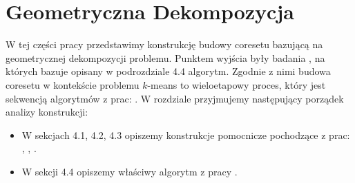 \chapter{Geometryczna Dekompozycja}\label{geo}
W tej części pracy przedstawimy konstrukcję budowy coresetu bazującą na geometrycznej dekompozycji problemu.
Punktem wyjścia były badania \cite{DBLP:journals/ki/MunteanuS18}, na których bazuje opisany w podrozdziale 4.4 algorytm.
Zgodnie z nimi budowa coresetu w kontekście problemu $k$-means to wieloetapowy proces, który jest sekwencją algorytmów z prac: \cite{Gonzalez1985ClusteringTM} \cite{10.1145/1007352.1007400} \cite{Arya2004LocalSH} \cite{DBLP:journals/ki/MunteanuS18}.
W rozdziale przyjmujemy następujący porządek analizy konstrukcji:
\begin{itemize}
    \item W sekcjach 4.1, 4.2, 4.3 opiszemy konstrukcje pomocnicze pochodzące z prac: \cite{Gonzalez1985ClusteringTM}, \cite{10.1145/1007352.1007400}, \cite{Arya2004LocalSH}.
    \item W sekcji 4.4 opiszemy właściwy algorytm z pracy \cite{DBLP:journals/ki/MunteanuS18}.
\end{itemize}





